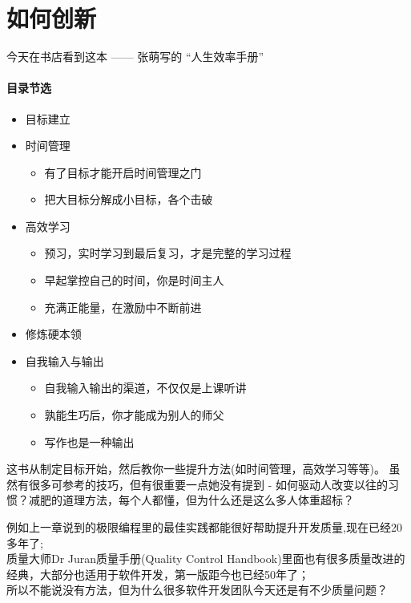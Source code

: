 

\chapter{如何创新} %


今天在书店看到这本 ------ 张萌写的 ``人生效率手册''

\hypertarget{ux76eeux5f55ux8282ux9009}{%
\subsubsection{目录节选}\label{ux76eeux5f55ux8282ux9009}}

\begin{itemize}
\tightlist
\item
  目标建立
\item
  时间管理

  \begin{itemize}
  \tightlist
  \item
    有了目标才能开启时间管理之门
  \item
    把大目标分解成小目标，各个击破
  \end{itemize}
\item
  高效学习

  \begin{itemize}
  \tightlist
  \item
    预习，实时学习到最后复习，才是完整的学习过程
  \item
    早起掌控自己的时间，你是时间主人
  \item
    充满正能量，在激励中不断前进
  \end{itemize}
\item
  修炼硬本领
\item
  自我输入与输出

  \begin{itemize}
  \tightlist
  \item
    自我输入输出的渠道，不仅仅是上课听讲
  \item
    孰能生巧后，你才能成为别人的师父
  \item
    写作也是一种输出
  \end{itemize}
\end{itemize}

这书从制定目标开始，然后教你一些提升方法(如时间管理，高效学习等等)。
虽然有很多可参考的技巧，但有很重要一点她没有提到 -
如何驱动人改变以往的习惯？减肥的道理方法，每个人都懂，但为什么还是这么多人体重超标？

例如上一章说到的极限编程里的最佳实践都能很好帮助提升开发质量,现在已经20多年了;\\
质量大师Dr Juran质量手册(Quality Control
Handbook)里面也有很多质量改进的经典，大部分也适用于软件开发，第一版距今也已经50年了；\\
所以不能说没有方法，但为什么很多软件开发团队今天还是有不少质量问题？

